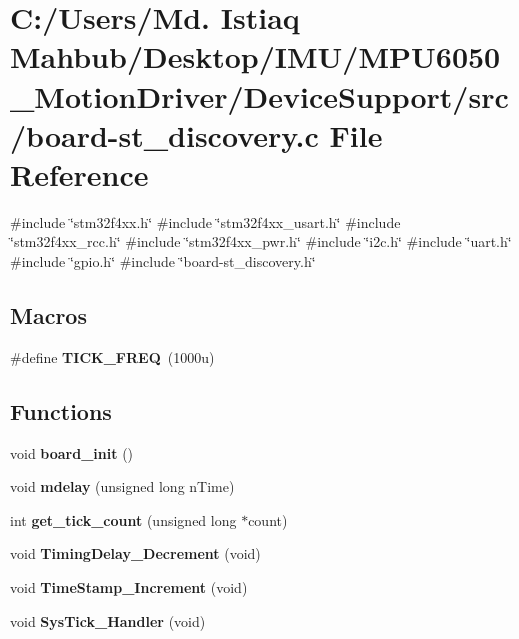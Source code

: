 \section{C\+:/\+Users/\+Md. Istiaq Mahbub/\+Desktop/\+I\+M\+U/\+M\+P\+U6050\+\_\+\+Motion\+Driver/\+Device\+Support/src/board-\/st\+\_\+discovery.c File Reference}
\label{board-st__discovery_8c}
{\ttfamily \#include \char`\"{}stm32f4xx.\+h\char`\"{}}\newline
{\ttfamily \#include \char`\"{}stm32f4xx\+\_\+usart.\+h\char`\"{}}\newline
{\ttfamily \#include \char`\"{}stm32f4xx\+\_\+rcc.\+h\char`\"{}}\newline
{\ttfamily \#include \char`\"{}stm32f4xx\+\_\+pwr.\+h\char`\"{}}\newline
{\ttfamily \#include \char`\"{}i2c.\+h\char`\"{}}\newline
{\ttfamily \#include \char`\"{}uart.\+h\char`\"{}}\newline
{\ttfamily \#include \char`\"{}gpio.\+h\char`\"{}}\newline
{\ttfamily \#include \char`\"{}board-\/st\+\_\+discovery.\+h\char`\"{}}\newline
\subsection*{Macros}
\begin{DoxyCompactItemize}
\item 
\#define \textbf{ T\+I\+C\+K\+\_\+\+F\+R\+EQ}~(1000u)
\end{DoxyCompactItemize}
\subsection*{Functions}
\begin{DoxyCompactItemize}
\item 
void \textbf{ board\+\_\+init} ()
\item 
void \textbf{ mdelay} (unsigned long n\+Time)
\item 
int \textbf{ get\+\_\+tick\+\_\+count} (unsigned long $\ast$count)
\item 
void \textbf{ Timing\+Delay\+\_\+\+Decrement} (void)
\item 
void \textbf{ Time\+Stamp\+\_\+\+Increment} (void)
\item 
void \textbf{ Sys\+Tick\+\_\+\+Handler} (void)
\end{DoxyCompactItemize}
